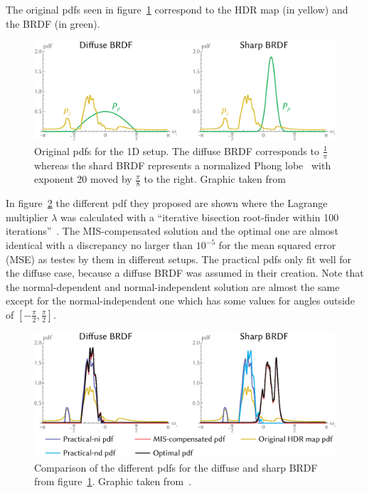 The original pdfs seen in figure~\ref{fig:ibl_pdfs} correspond to the HDR map (in yellow) and the BRDF (in green).

\begin{figure}
    \centering
    \includegraphics[width=.7\textwidth]{images/ibl_pdfs.png}
    \caption{Original pdfs for the 1D setup.
    The diffuse BRDF corresponds to $ \frac{1}{\pi} $
    whereas the shard BRDF represents a normalized Phong lobe~\cite{phong} with exponent 20 moved by $ \frac{\pi}{8} $ to the right.
    Graphic taken from~\cite[Figure~4]{Karlik2019}}
    \label{fig:ibl_pdfs}
\end{figure}

In figure~\ref{fig:compensated_pdfs} the different pdf they proposed are shown
where the Lagrange multiplier $ \lambda $ was calculated with a \enquote{iterative bisection root-finder within 100 iterations}~\cite[Section~6.3]{Karlik2019}.
The MIS-compensated solution and the optimal one are almost identical with a discrepancy no larger than $ 10^{-5} $
for the mean squared error (MSE) as testes by them in different setups.
The practical pdfs only fit well for the diffuse case, because a diffuse BRDF was assumed in their creation.
Note that the normal-dependent and normal-independent solution are almost the same except for the normal-independent one which has some values for angles outside of $ [ -\frac{\pi}{2}, \frac{\pi}{2} ] $.

\begin{figure}
    \centering
    \includegraphics[width=.7\textwidth]{images/ibl_compensated_pdfs.png}
    \caption{Comparison of the different pdfs for the diffuse and sharp BRDF from figure~\ref{fig:ibl_pdfs}.
    Graphic taken from~\cite[Figure~5]{Karlik2019}.}
    \label{fig:compensated_pdfs}
\end{figure}

